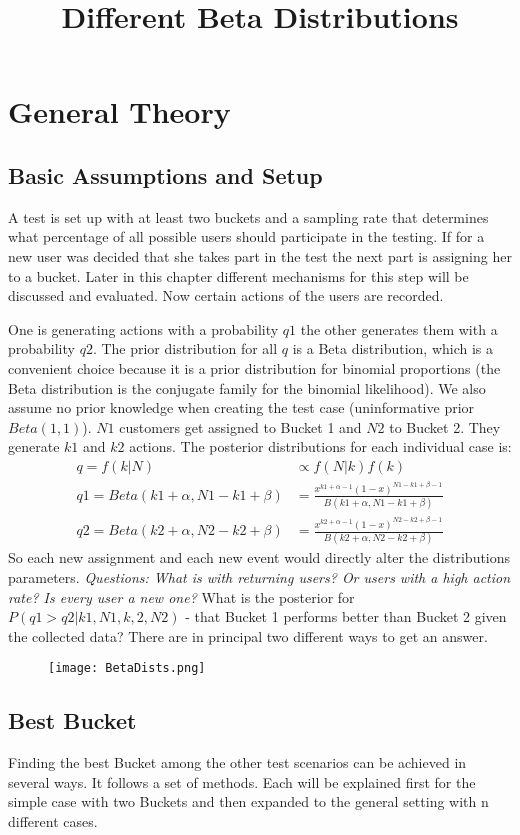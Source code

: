 \documentclass[../Thesis.tex]{subfiles}
\begin{document}
\chapter{General Theory}
\section{Basic Assumptions and Setup}
A test is set up with at least two buckets and a sampling rate that determines what percentage of all possible users should participate in the testing. If for a new user was decided that she takes part in the test the next part is assigning her to a bucket. Later in this chapter different mechanisms for this step will be discussed and evaluated. Now certain actions of the users are recorded.

 One is generating actions with a probability $q1$ the other generates them with a probability $q2$. The prior distribution for all $q$ is a Beta distribution, which is a convenient choice because it is a prior distribution for binomial proportions (the Beta distribution is the conjugate family for the binomial likelihood). We also assume no prior knowledge when creating the test case (uninformative prior $Beta(1,1)$). $N1$ customers get assigned to Bucket 1 and $N2$ to Bucket 2. They generate $k1$ and $k2$ actions. The posterior distributions for each individual case is:
\begin{align*}
q = f(k|N) &\propto f(N|k)f(k)\\
q1 = Beta(k1+\alpha,N1-k1+\beta) & = \frac{x^{k1+\alpha-1}(1-x)^{N1-k1+\beta -1}}{B(k1+\alpha,N1-k1+\beta)} \\
q2 = Beta(k2+\alpha,N2-k2+\beta) & = \frac{x^{k2+\alpha-1}(1-x)^{N2-k2+\beta -1}}{B(k2+\alpha,N2-k2+\beta)}
\end{align*}
So each new assignment and each new event would directly alter the distributions parameters.\textit{ Questions: What is with returning users? Or users with a high action rate? Is every user a new one?}
What is the posterior for $P(q1>q2 | k1,N1,k,2,N2)$ - that Bucket 1 performs better than Bucket 2 given the collected data? There are in principal two different ways to get an answer.
\begin{figure}[h]
\texttt{[image: BetaDists.png]}
\centering
\title{Different Beta Distributions}
\end{figure}

\section{Best Bucket}
Finding the best Bucket among the other test scenarios can be achieved in several ways. It follows a set of methods. Each will be explained first for the simple case with two Buckets and then expanded to the general setting with n different cases.
\end{document}
